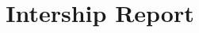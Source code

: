 \documentclass[oneside]{normas-utf-tex} %
\title{Intership Report}      %
\begin{document}
\capa %
\folhaderosto %

\termodeentrega

\listadefiguras %
\listadetabelas %
\listadesiglas %

\sumario %




\setlength{\parskip}{0.0cm}






\clearpage %
\label{bibstart}
\label{bibend}



%
%
%
%
\end{document}
